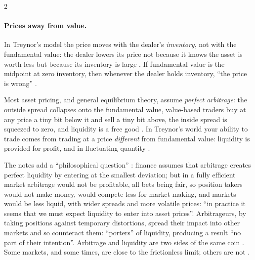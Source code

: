 \begin{paracol}{2}
\paragraph{Prices away from value.} In Treynor's model the price moves with the dealer's \emph{inventory}, not with the fundamental value: the dealer lowers its price not because it knows the
asset is worth less but because its inventory is large . If fundamental value is the midpoint at zero inventory, then whenever the dealer holds
inventory, ``the price is wrong'' .

\begin{proposition}
Most asset pricing, and general equilibrium theory, assume \emph{perfect arbitrage}: the outside spread collapses onto the fundamental value, value-based traders buy at any price a tiny bit below
it and sell a tiny bit above, the inside spread is squeezed to zero, and liquidity is a free good . In Treynor's world your
ability to trade comes from trading at a price \emph{different} from fundamental value: liquidity is provided for profit, and in fluctuating quantity .
\end{proposition}

The notes add a ``philosophical question'' : finance assumes that arbitrage creates perfect liquidity by entering at the smallest deviation; but in a fully efficient market
arbitrage would not be profitable, all bets being fair, so position takers would not make money, would compete less for market making, and markets would be less liquid, with wider spreads and
more volatile prices: ``in practice it seems that we must expect liquidity to enter into asset prices''. Arbitrageurs, by taking positions against temporary distortions, spread their
impact into other markets and so counteract them: ``porters'' of liquidity, producing a result ``no part of their intention''. Arbitrage and liquidity are two sides of the same coin
. Some markets, and some times, are close to the frictionless limit; others are not .


\end{paracol}
